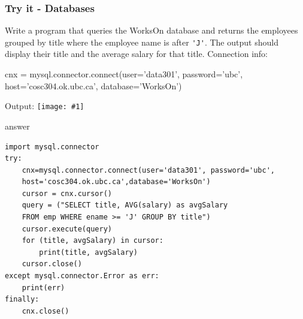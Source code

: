 \documentclass[xcolor=svgnames]{beamer}
\newcommand{\ipic}[2]{\texttt{[image: \#1]}}
\newcommand{\ft}[1]{\frametitle{#1}}
\begin{document}
\begin{frame}[fragile]\ft{Try it - Databases}
\begin{example}
 Write a program that queries the {\sf WorksOn} database and returns the employees grouped by title where the employee name is after \verb|'J'|.  The output should display their title and the average salary for that title. Connection info:
 \begin{spverbatim}
cnx = mysql.connector.connect(user='data301', password='ubc', host='cosc304.ok.ubc.ca', database='WorksOn')
 \end{spverbatim}
Output: \ipic{Database}{0.3}
\end{example}
\end{frame}


%


\begin{frame}[fragile]
\begin{block}{answer}
\begin{Verbatim}[xleftmargin=-0.1in, fontsize=\small] 
import mysql.connector
try:
    cnx=mysql.connector.connect(user='data301', password='ubc',
    host='cosc304.ok.ubc.ca',database='WorksOn')
    cursor = cnx.cursor()
    query = ("SELECT title, AVG(salary) as avgSalary 
    FROM emp WHERE ename >= 'J' GROUP BY title")
    cursor.execute(query)
    for (title, avgSalary) in cursor:
        print(title, avgSalary)
    cursor.close()
except mysql.connector.Error as err:
    print(err)
finally:
    cnx.close()
\end{Verbatim}
\end{block}
\end{frame}
\end{document}
